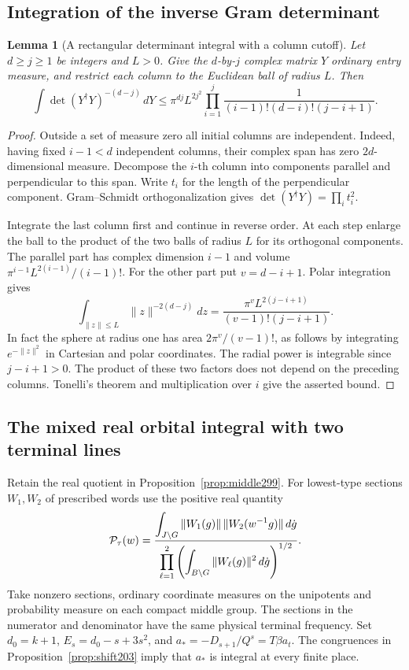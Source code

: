 \documentclass[a4paper,11pt]{article}
\newtheorem{lemma}[proposition]{Lemma}
\theoremstyle{definition}
\theoremstyle{remark}
\numberwithin{equation}{section}
\begin{document}
\subsection{Integration of the inverse Gram determinant}\label{nav:V-52}
\begin{lemma}[A rectangular determinant integral with a column cutoff]\leavevmode
\label{lem:blockgram296}
Let \(d\ge j\ge1\) be integers and \(L>0\). Give the
\(d\)-by-\(j\) complex matrix \(Y\) ordinary entry measure, and
restrict each column to the Euclidean ball of radius \(L\).
Then
\[
  \int \det(Y^\dagger Y)^{-(d-j)}\,dY
  \le
  \pi^{dj}L^{2j^2}
  \prod_{i=1}^j
      \frac{1}{(i-1)!(d-i)!(j-i+1)}.
\]
\end{lemma}
\begin{proof}
Outside a set of measure zero all initial columns are independent.
Indeed, having fixed \(i-1<d\) independent columns, their complex
span has zero \(2d\)-dimensional measure. Decompose the \(i\)-th
column into components parallel and perpendicular to this span.
Write \(t_i\) for the length of the perpendicular component.
Gram--Schmidt orthogonalization gives
\(\det(Y^\dagger Y)=\prod_i t_i^2\).

Integrate the last column first and continue in reverse order.
At each step enlarge the ball to the product of the two balls
of radius \(L\) for its orthogonal components. The parallel
part has complex dimension \(i-1\) and volume
\(\pi^{i-1}L^{2(i-1)}/(i-1)!\). For the other part put
\(v=d-i+1\). Polar integration gives
\[
 \int_{\|z\|\le L}\|z\|^{-2(d-j)}dz
    =\frac{\pi^v L^{2(j-i+1)}}{(v-1)!(j-i+1)}.
\]
In fact the sphere at radius one has area \(2\pi^v/(v-1)!\),
as follows by integrating \(e^{-\|z\|^2}\) in Cartesian and
polar coordinates. The radial power is integrable since
\(j-i+1>0\). The product of these two factors does not
depend on the preceding columns. Tonelli's theorem and
multiplication over \(i\) give the asserted bound.
\end{proof}

\subsection{The mixed real orbital integral with two terminal lines}\label{nav:V-54}
Retain the real quotient in Proposition~\ref{prop:middle299}.
For lowest-type sections \(W_1,W_2\) of prescribed words
use the positive real quantity
\[
 {\cal P}_\tau(w)=
 \frac{\displaystyle\int_{J\backslash G}
          \|W_1(g)\|\,\|W_2(w^{-1}g)\|\,d\dot g}
      {\displaystyle\prod_{\ell=1}^2
        \left(\int_{B\backslash G}\|W_\ell(g)\|^2\,d\dot g\right)^{1/2}} .
\]
Take nonzero sections, ordinary coordinate measures on the
unipotents and probability measure on each compact middle
group. The sections in the numerator and denominator have
the same physical terminal frequency. Set \(d_0=k+1\),
\(E_s=d_0-s+3s^2\), and \(a_*=-D_{s+1}/Q^s=T\beta a_t\).
The congruences in Proposition~\ref{prop:shift203} imply
that \(a_*\) is integral at every finite place.
\end{document}
